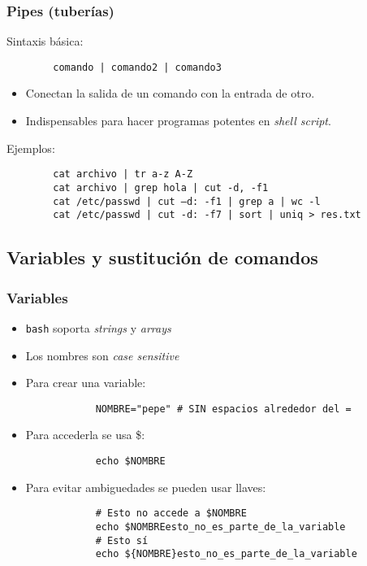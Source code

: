 \begin{frame}[fragile]
	\frametitle{Pipes (tuberías)}
	Sintaxis básica:
	\begin{lstlisting}
		comando | comando2 | comando3
	\end{lstlisting}
	\begin{itemize}
    \item Conectan la \alert{salida} de un comando con la \alert{entrada}
      de otro.
		\item Indispensables para hacer programas potentes en \textit{shell
            script}.
	\end{itemize}
	Ejemplos:
	\begin{lstlisting}
		cat archivo | tr a-z A-Z
		cat archivo | grep hola | cut -d, -f1
		cat /etc/passwd | cut –d: -f1 | grep a | wc -l
		cat /etc/passwd | cut -d: -f7 | sort | uniq > res.txt
	\end{lstlisting}	
\end{frame}


\subsection{Variables y sustitución de comandos}
\begin{frame}[fragile]
	\frametitle{Variables}
	\begin{itemize}[<+->]
		\item \texttt{bash} soporta \textit{strings} y \textit{arrays}
		\item Los nombres son \textit{case sensitive}
		\item Para crear una variable:
		\begin{lstlisting}
			NOMBRE="pepe" # SIN espacios alrededor del =
		\end{lstlisting}
		\item Para accederla se usa \${}:
		\begin{lstlisting}
			echo $NOMBRE
		\end{lstlisting}%
		
		\item Para evitar ambiguedades se pueden usar llaves:
		\begin{lstlisting}
			# Esto no accede a $NOMBRE
			echo $NOMBREesto_no_es_parte_de_la_variable
			# Esto sí
			echo ${NOMBRE}esto_no_es_parte_de_la_variable
		\end{lstlisting}%
	\end{itemize}
\end{frame}

